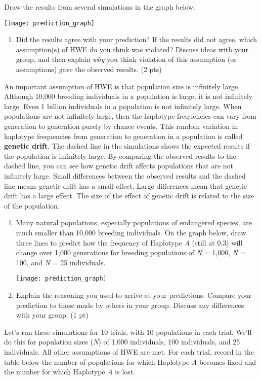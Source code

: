 \documentclass[11pt]{article}
\begin{document}
Draw the results from several simulations in the graph below.

\begin{center}
	\texttt{[image: prediction\_graph]}
\end{center}

\begin{enumerate}[resume]

\item Did the results agree with your prediction? If the results did not agree, which assumption(s) of HWE do you think was violated? Discuss ideas with your group, and then explain \emph{why} you think violation of this assumption (or assumptions) gave the observed results.
(2 pts)
\end{enumerate}\vspace{6.5cm}

An important assumption of HWE is that population size is infinitely large. Although 10,000 breeding individuals in a population is large, it is not infinitely large. Even 1 billion individuals in a population is not infinitely large. When populations are not infinitely large, then the haplotype frequencies can vary from generation to generation purely by chance events. This random variation in haplotype frequencies from generation to generation in a population is called \textbf{genetic drift}. The dashed line in the simulations shows the expected results if the population is infinitely large. By comparing the observed results to the dashed line, you can see how genetic drift affects populations that are not infinitely large. Small differences between the observed results and the dashed line means genetic drift has a small effect. Large differences mean that genetic drift has a large effect. The size of the effect of genetic drift is related to the size of the population.

\begin{enumerate}[resume]
\item Many natural populations, especially populations of
endangered species, are much smaller than 10,000 breeding individuals.
On the graph below, draw three lines to predict how the frequency of
Haplotype \emph{A} (still at 0.3) will change over 1,000 generations for
breeding populations of \emph{N} = 1,000, \emph{N} = 100, and \emph{N} =
25 individuals.

\begin{center}
	\texttt{[image: prediction\_graph]}
\end{center}

\item Explain the reasoning you used to arrive at your
predictions. Compare your prediction to those made by others in your
group. Discuss any differences with your group. (1 pt)
\end{enumerate}%
\newpage
Let's run these simulations for 10 trials, with 10 populations in each
trial. We'll do this for population sizes (\emph{N}) of 1,000
individuals, 100 individuals, and 25 individuals. All other assumptions
of HWE are met. For each trial, record in the table below the number of
populations for which Haplotype \emph{A} becomes fixed and the number
for which Haplotype \emph{A} is lost.
\end{document}
